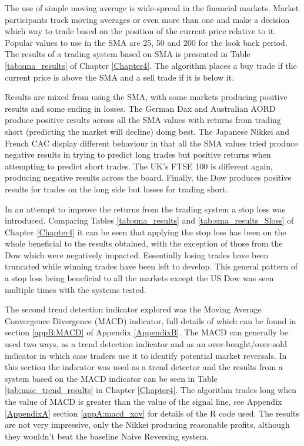 The use of simple moving average is wide-spread in the financial markets. Market participants track moving averages or even more than one and make a decision which way to trade based on the position of the current price relative to it. Popular values to use in the SMA are 25, 50 and 200 for the look back period. The results of a trading system based on SMA is presented in Table \ref{tab:sma_results} of Chapter \ref{Chapter4}. The algorithm places a buy trade if the current price is above the SMA and a sell trade if it is below it. 

Results are mixed from using the SMA, with some markets producing positive results and some ending in losses. The German Dax and Australian AORD produce positive results across all the SMA values with returns from trading short (predicting the market will decline) doing best.  The Japanese Nikkei and French CAC display different behaviour in that all the SMA values tried produce negative results in trying to  predict long trades but positive returns when attempting to predict short trades.  The UK's FTSE 100 is different again, producing negative results across the board. Finally, the Dow produces positive results for trades on the long side but losses for trading short.


In an attempt to improve the returns from the trading system a stop loss was introduced. Comparing Tables \ref{tab:sma_results} and \ref{tab:sma_results_Sloss} of Chapter \ref{Chapter4}
it can be seen that applying the stop loss has been on the whole beneficial to the results obtained, with the exception of those from the Dow which were negatively impacted. Essentially losing trades have been truncated while winning trades have been left to develop. This general pattern of a stop loss being beneficial to all the markets except the US Dow was seen multiple times with the systems tested.

The second trend detection indicator explored was the Moving Average Convergence Divergence (MACD) indicator, full details of which can be found in section \ref{appB:MACD} of Appendix \ref{AppendixB}. The MACD can generally be used two ways, as a trend detection indicator and as an over-bought/over-sold indicator in which case traders use it to identify potential market reversals. In this section the indicator was used as a trend detector and the results from a system based on the MACD indicator can be seen in Table \ref{tab:mac_trend_results} in Chapter \ref{Chapter4}.  The algorithm trades long when the value of MACD is greater than the value of the signal line, see Appendix \ref{AppendixA} section \ref{appA:macd_xov} for details of the R code used. The results are not very impressive, only the Nikkei producing reasonable profits, although they wouldn't beat the baseline Naive Reversing system.

